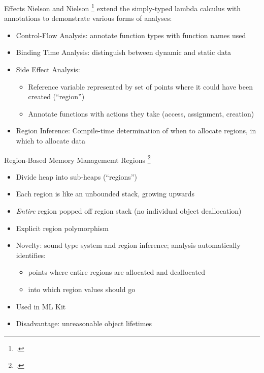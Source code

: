 \documentclass[aspectratio=169]{beamer}
\begin{document}

\begin{frame}{Effects}
    Nielson and Nielson \footcite{nielson_type_1999} extend the simply-typed lambda calculus with annotations to demonstrate various forms of analyses:
    \begin{itemize}
        \item Control-Flow Analysis: annotate function types with function names used
        \item Binding Time Analysis: distinguish between dynamic and static data
        \item Side Effect Analysis:
            \begin{itemize}
                \item Reference variable represented by set of points where it could have been created (``region'')
                \item Annotate functions with actions they take (access, assignment, creation)
            \end{itemize}
        \item Region Inference: Compile-time determination of when to allocate regions, in which to allocate data
    \end{itemize}
\end{frame}


\begin{frame}{Region-Based Memory Managememt}
    Regions \footcite{tofte_region-based_1997}
    \begin{itemize}
        \item Divide heap into sub-heaps (``regions'')
        \item Each region is like an unbounded stack, growing upwards
        \item \emph{Entire} region popped off region stack (no individual object deallocation)
        \item Explicit region polymorphism %
        \item Novelty: sound type system and region inference; analysis automatically identifies:
            \vspace{-0.1in}
            \begin{itemize}
                \item points where entire regions are allocated and deallocated
                \item into which region values should go
            \end{itemize}
        \item Used in ML Kit
        \item Disadvantage: unreasonable object lifetimes %
    \end{itemize}
\end{frame}
\end{document}
